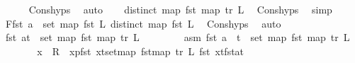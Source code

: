 \begin{isabellebody}
\ \ \ \ \isamarkupfalse%
\ Cons{\isachardot}{\kern0pt}hyps{\isacharparenleft}{\kern0pt}{}{\isacharparenright}{\kern0pt}\ \isamarkupfalse%
\ auto\isanewline
\ \ \isamarkupfalse%
\ {\isachardoublequoteopen}distinct\ {\isacharparenleft}{\kern0pt}map\ fst\ {\isacharparenleft}{\kern0pt}map\ tr\ L{\isacharparenright}{\kern0pt}{\isacharparenright}{\kern0pt}{\isachardoublequoteclose}\ \isamarkupfalse%
\ Cons{\isachardot}{\kern0pt}hyps\ \isamarkupfalse%
\ simp\isanewline
\ \ \isamarkupfalse%
\ F{}{\isacharcolon}{\kern0pt}{\isachardoublequoteopen}fst\ a\ {\isasymnotin}\ set\ {\isacharparenleft}{\kern0pt}map\ fst\ L{\isacharparenright}{\kern0pt}{\isachardoublequoteclose}\ {\isachardoublequoteopen}distinct\ {\isacharparenleft}{\kern0pt}map\ fst\ L{\isacharparenright}{\kern0pt}{\isachardoublequoteclose}\ \isamarkupfalse%
\ Cons{\isachardot}{\kern0pt}hyps{\isacharparenleft}{\kern0pt}{}{\isacharparenright}{\kern0pt}\ \isamarkupfalse%
\ auto\isanewline
\ \ \isamarkupfalse%
\ {\isachardoublequoteopen}fst\ {\isacharparenleft}{\kern0pt}a{\isacharplus}{\kern0pt}t{\isacharparenright}{\kern0pt}\ {\isasymnotin}\ set\ {\isacharparenleft}{\kern0pt}map\ fst\ {\isacharparenleft}{\kern0pt}map\ tr\ L{\isacharparenright}{\kern0pt}{\isacharparenright}{\kern0pt}{\isachardoublequoteclose}\isanewline
\ \ \isamarkupfalse%
\isanewline
\ \ \ \ \isamarkupfalse%
\ asm{\isacharcolon}{\kern0pt}\ {\isachardoublequoteopen}fst\ {\isacharparenleft}{\kern0pt}a\ {\isacharplus}{\kern0pt}\ t{\isacharparenright}{\kern0pt}\ {\isasymin}\ set\ {\isacharparenleft}{\kern0pt}map\ fst\ {\isacharparenleft}{\kern0pt}map\ tr\ L{\isacharparenright}{\kern0pt}{\isacharparenright}{\kern0pt}{\isachardoublequoteclose}\isanewline
\ \ \ \ \isamarkupfalse%
\ \isamarkupfalse%
\ x\ {\isacharcolon}{\kern0pt}{\isacharcolon}{\kern0pt}\ R{}\ \ xp{\isacharcolon}{\kern0pt}{\isachardoublequoteopen}fst\ {\isacharparenleft}{\kern0pt}x{\isacharplus}{\kern0pt}t{\isacharparenright}{\kern0pt}{\isasymin}set{\isacharparenleft}{\kern0pt}map\ fst{\isacharparenleft}{\kern0pt}map\ tr\ L{\isacharparenright}{\kern0pt}{\isacharparenright}{\kern0pt}{\isachardoublequoteclose}\ {\isachardoublequoteopen}fst\ {\isacharparenleft}{\kern0pt}x{\isacharplus}{\kern0pt}t{\isacharparenright}{\kern0pt}{\isacharequal}{\kern0pt}fst{\isacharparenleft}{\kern0pt}a{\isacharplus}{\kern0pt}t{\isacharparenright}{\kern0pt}{\isachardoublequoteclose}\ \isamarkupfalse%

\end{isabellebody}

